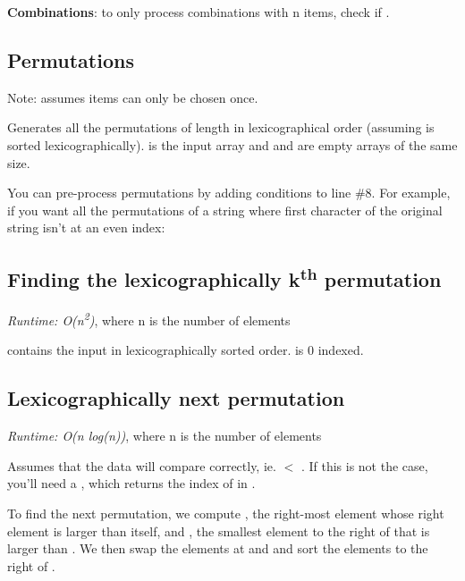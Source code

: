 
\textbf{Combinations}: to only process combinations with n items, check if .

\subsection*{Permutations}

Note: assumes items can only be chosen once.

Generates all the permutations of length  in lexicographical order (assuming  is sorted lexicographically).  is the input array and  and  are empty arrays of the same size. 



You can pre-process permutations by adding conditions to line \#8. For example, if you want all the permutations of a string where first character of the original string isn't at an even index:



\subsection*{Finding the lexicographically  k\textsuperscript{th} permutation}

\textit{Runtime: O(n\textsuperscript{2})}, where n is the number of elements

 contains the input in lexicographically sorted order.  is 0 indexed.



\subsection*{Lexicographically next permutation}

\textit{Runtime: O(n log(n))}, where n is the number of elements

Assumes that the data will compare correctly, ie.  $<$ . If this is not the case, you'll need a , which returns the index of  in .

To find the next permutation, we compute , the right-most element whose right element is larger than itself, and , the smallest element to the right of  that is larger than . We then swap the elements at  and  and sort the elements to the right of .



\newpage